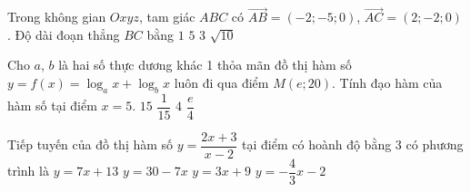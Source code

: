 \begin{ex}%
	Trong không gian $Oxyz$, tam giác $ABC$ có $\overrightarrow{AB}=\left(-2;-5;0\right)$, $\overrightarrow{AC}=\left(2;-2;0\right)$. Độ dài đoạn thẳng $BC$ bằng
	\choice
	{$1$}
	{\True $5$}
	{$3$}
	{$\sqrt{10}$}
\end{ex}

\begin{ex}%
	Cho $a$, $b$ là hai số thực dương khác 1 thỏa mãn đồ thị hàm số $y=f\left(x\right)=\log_{a} x + \log_{b} x$ luôn đi qua điểm $M\left(e;20\right)$. Tính đạo hàm của hàm số tại điểm $x=5$.
	\choice
	{$15$}
	{$\dfrac{1}{15}$}
	{\True $4$}
	{$\dfrac{e}{4}$}
\end{ex}

\begin{ex}%
	Tiếp tuyến của đồ thị hàm số $y=\dfrac{2x+3}{x-2}$ tại điểm có hoành độ bằng $3$ có phương trình là
	\choice
	{$y=7x+13$}
	{\True $y=30-7x$}
	{$y=3x+9$}
	{$y=-\dfrac{4}{3}x-2$}
\end{ex}

